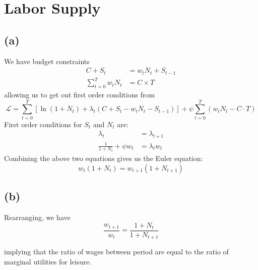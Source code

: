 \documentclass[11pt]{amsart}
\begin{document}
\section{Labor Supply}

\subsection*{(a)}
We have budget constraints
	\begin{align*}
	C + S_t &= w_t N_t + S_{t-1} \\
	\sum_{t=0}^{T} w_t N_t & = C \times T
	\end{align*} 
allowing us to get out first order conditions from
	\begin{equation*}
	\mathcal{L} = \sum_{t=0}^{T}  \left[ \ln (1+ N_t) + \lambda_t \left(C + S_t - w_t N_t - S_{t-1} \right) \right] + \psi \sum_{t=0}^{T} \left( w_t N_t - C \cdot T\right)  
	\end{equation*}
    First order conditions for $S_t$ and $N_t$ are: 
    \begin{align*}
    \lambda_t &= \lambda_{t+1} \\
    \frac{1}{1+N_t} + \psi w_t &= \lambda_t w_t 
    \end{align*}
    Combining the above two equations gives us the Euler equation: 
    \begin{equation*}
    w_t (1+ N_t) = w_{t+1} (1+N_{t+1})
    \end{equation*}

\subsection*{(b)}
Rearranging, we have
    \begin{equation*}
    \frac{w_{t+1}}{w_t} = \frac{1+N_t}{1+ N_{t+1}} 
    \end{equation*}

implying that the ratio of wages between period are equal to the ratio of marginal utilities for leisure.
    
\end{document}

